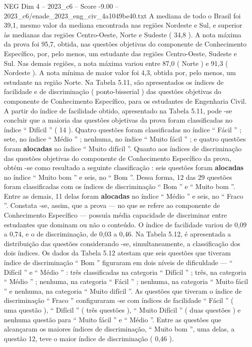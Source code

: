 \begin{textsample}{NEG Dim 4 – 2023\_c6 – Score -9.00 – 2023\_c6/enade\_2023\_eng\_civ\_4a1049be40.txt}
A mediana de todo o Brasil foi 39,1, mesmo valor da mediana encontrada nas regiões Nordeste e Sul, e superior às medianas das regiões Centro-Oeste, Norte e Sudeste ( 34,8 ).
A nota máxima da prova foi 95,7, obtida, nas questões objetivas do componente de Conhecimento Específico, por, pelo menos, um estudante das regiões Centro-Oeste, Sudeste e Sul.
Nas demais regiões, a nota máxima variou entre 87,0 ( Norte ) e 91,3 ( Nordeste ).
A nota mínima de maior valor foi 4,3, obtida por, pelo menos, um estudante na região Norte.
Na Tabela 5.11, são apresentados os índices de facilidade e de discriminação ( ponto-bisserial ) das questões objetivas do componente de Conhecimento Específico, para os estudantes de Engenharia Civil.
A partir do índice de facilidade obtido, apresentado na Tabela 5.11, pode -se concluir que a maioria das questões objetivas da prova foram classificadas no índice “ Difícil ” ( 14 ).
Quatro questões foram classificadas no índice “ Fácil ” ; sete, no índice “ Médio ” ; nenhuma, no índice “ Muito fácil ” ; e quatro questões foram \textbf{alocadas} no índice “ Muito difícil ”.
Quanto aos índices de discriminação das questões objetivas do componente de Conhecimento Específico da prova, obtém -se como resultado a seguinte classificação : seis questões foram \textbf{alocadas} no índice “ Muito bom ” e seis, no “ Bom ”.
Dessa forma, 12 das 29 questões foram classificadas com os índices de discriminação “ Bom ” e “ Muito bom ”.
Entre as demais, 11 delas foram \textbf{alocadas} no índice “ Médio ” e seis, no “ Fraco ”.
Constata -se, assim, que a prova — no que se refere ao componente de Conhecimento Específico — possuía média capacidade de discriminar entre estudantes que dominam ou não o conteúdo.
O índice de facilidade variou de 0,09 a 0,74, e o de discriminação, de 0,03 a 0,46.
Na Tabela 5.12, é apresentada a distribuição das questões considerando -se, simultaneamente, a classificação dos dois índices.
Os dados da Tabela 5.12 atestam que seis questões que tiveram índice de discriminação “ Bom ” figuraram em dois níveis de dificuldade — “ Difícil ” e “ Médio ” : três classificadas na categoria “ Difícil ” ; três, na categoria “ Médio ” ; nenhuma, na categoria “ Fácil ” ; nenhuma, na categoria “ Muito fácil ” e nenhuma, na categoria “ Muito difícil ”.
As questões que tiveram o índice de discriminação “ Fraco ” configuraram -se com índices de facilidade “ Fácil ” ( uma questão ), “ Difícil ” ( três questões ), “ Muito Difícil ” ( duas questões ) e nenhuma questão para “ Muito fácil ” e “ Médio ”.
Entre as questões que alcançaram os maiores índices de discriminação, “ Muito bom ”, uma delas, a questão 12, teve o maior índice de discriminação ( 0,46 ).

\end{textsample}
